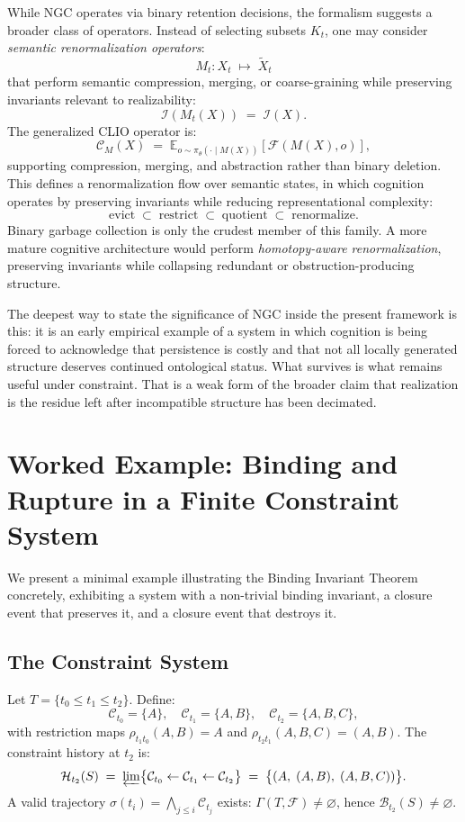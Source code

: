 \documentclass[11pt, letterpaper]{article}
\theoremstyle{plain}
\theoremstyle{definition}
\theoremstyle{remark}
\newcommand{\BI}{\mathcal{B}}
\newcommand{\CC}{\mathcal{C}}
\newcommand{\HH}{\mathcal{H}}
\newcommand{\FF}{\mathcal{F}}
\begin{document}
While NGC operates via binary retention decisions, the formalism suggests a broader
class of operators. Instead of selecting subsets $K_t$, one may consider
\emph{semantic renormalization operators}:
\[
  M_t : X_t \;\mapsto\; \tilde{X}_t
\]
that perform semantic compression, merging, or coarse-graining while preserving
invariants relevant to realizability:
\[
  \mathcal{I}(M_t(X)) \;=\; \mathcal{I}(X).
\]
The generalized CLIO operator is:
\[
  \CC_M(X) \;=\; \mathbb{E}_{o \sim \pi_\theta(\cdot \mid M(X))}[\mathcal{F}(M(X), o)],
\]
supporting compression, merging, and abstraction rather than binary deletion. This
defines a renormalization flow over semantic states, in which cognition operates by
preserving invariants while reducing representational complexity:
\[
  \text{evict} \;\subset\; \text{restrict} \;\subset\; \text{quotient} \;\subset\; \text{renormalize}.
\]
Binary garbage collection is only the crudest member of this family. A more mature
cognitive architecture would perform \emph{homotopy-aware renormalization}, preserving
invariants while collapsing redundant or obstruction-producing structure.

The deepest way to state the significance of NGC inside the present framework is this:
it is an early empirical example of a system in which cognition is being forced to
acknowledge that persistence is costly and that not all locally generated structure
deserves continued ontological status. What survives is what remains useful under
constraint. That is a weak form of the broader claim that realization is the residue
left after incompatible structure has been decimated.

\section{Worked Example: Binding and Rupture in a Finite Constraint System}

We present a minimal example illustrating the Binding Invariant Theorem concretely,
exhibiting a system with a non-trivial binding invariant, a closure event that preserves
it, and a closure event that destroys it.

\subsection{The Constraint System}

Let $T = \{t_0 \leq t_1 \leq t_2\}$. Define:
\[
  \CC_{t_0} = \{A\},\quad
  \CC_{t_1} = \{A, B\},\quad
  \CC_{t_2} = \{A, B, C\},
\]
with restriction maps $\rho_{t_1 t_0}(A,B) = A$ and $\rho_{t_2 t_1}(A,B,C) = (A,B)$.
The constraint history at $t_2$ is:
\[
  \HH_{t_2}(S) \;=\; \varprojlim\bigl\{\CC_{t_0} \leftarrow \CC_{t_1} \leftarrow \CC_{t_2}\bigr\}
  \;=\; \bigl\{(A,\; (A,B),\; (A,B,C))\bigr\}.
\]
A valid trajectory $\sigma(t_i) = \bigwedge_{j \leq i}\CC_{t_j}$ exists:
$\Gamma(T, \FF) \neq \varnothing$, hence $\BI_{t_2}(S) \neq \varnothing$.
\end{document}
